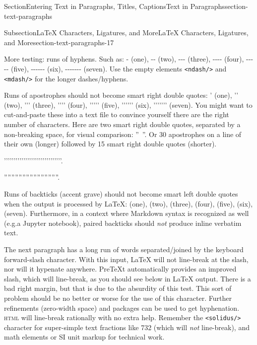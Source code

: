 \documentclass[twoside,10pt,]{article}
\newcommand{\mono}[1]{\texttt{#1}}
\newcommand{\initialism}[1]{\textsc{\MakeLowercase{#1}}}
\numberwithin{equation}{section}
\begin{document}
\begin{sectionptx}{Section}{Entering Text in Paragraphs, Titles, Captions}{}{Text in Paragraphs}{}{}{section-text-paragraphs}
\begin{subsectionptx}{Subsection}{\LaTeX{} Characters, Ligatures, and More}{}{\LaTeX{} Characters, Ligatures, and More}{}{}{section-text-paragraphs-17}
\par
More testing: runs of hyphens.  Such as: - (one), -{}-{} (two), -{}-{}- (three), -{}-{}-{}-{} (four), -{}-{}-{}-{}- (five), -{}-{}-{}-{}-{}-{} (six), -{}-{}-{}-{}-{}-{}- (seven).  Use the empty elements \mono{<ndash/>} and \mono{<mdash/>} for the longer dashes\slash{}hyphens.%
\par
Runs of apostrophes should not become smart right double quotes:  ' (one), '{}'{} (two), '{}'{}' (three), '{}'{}'{}'{} (four), '{}'{}'{}'{}' (five), '{}'{}'{}'{}'{}'{} (six), '{}'{}'{}'{}'{}'{}' (seven).    You might want to cut-and-paste these into a text file to convince yourself there are the right number of characters.  Here are two smart right double quotes, separated by a non-breaking space, for visual comparison: ''~''.  Or 30 apostrophes on a line of their own (longer) followed by 15 smart right double quotes (shorter).%
\par
'{}'{}'{}'{}'{}'{}'{}'{}'{}'{}'{}'{}'{}'{}'{}'{}'{}'{}'{}'{}'{}'{}'{}'{}'{}'{}'{}'{}'{}'{}.%
\par
''''''''''''''''''''''''''''''.%
\par
Runs of backticks (accent grave) should not become smart left double quotes when the output is processed by \LaTeX{}:  \textasciigrave{} (one), \textasciigrave{}\textasciigrave{} (two), \textasciigrave{}\textasciigrave{}\textasciigrave{} (three), \textasciigrave{}\textasciigrave{}\textasciigrave{}\textasciigrave{} (four), \textasciigrave{}\textasciigrave{}\textasciigrave{}\textasciigrave{}\textasciigrave{} (five), \textasciigrave{}\textasciigrave{}\textasciigrave{}\textasciigrave{}\textasciigrave{}\textasciigrave{} (six), \textasciigrave{}\textasciigrave{}\textasciigrave{}\textasciigrave{}\textasciigrave{}\textasciigrave{}\textasciigrave{} (seven).  Furthermore, in a context where Markdown syntax is recognized as well (e.g.\@ a Jupyter notebook), paired backticks should \emph{not} produce \textasciigrave{}inline verbatim text\textasciigrave{}.%
\par
The next paragraph has a long run of words separated\slash{}joined by the keyboard forward-slash character.  With this input, \LaTeX{} will not line-break at the slash, nor will it hypenate anywhere.  PreTeXt  automatically provides an improved slash, which will line-break, as you should see below in \LaTeX{} output.  There is a bad right margin, but that is due to the absurdity of this test.  This sort of problem should be no better or worse for the use of this character.  Further refinements (zero-width space) and packages can be used to get hyphenation.  \initialism{HTML} will line-break rationally with no extra help.  Remember the \mono{<solidus/>} character for super-simple text fractions like 7\textfractionsolidus{}32 (which will \emph{not} line-break), and math elements or SI unit markup for technical work.%

\end{subsectionptx}
\end{sectionptx}
\end{document}
